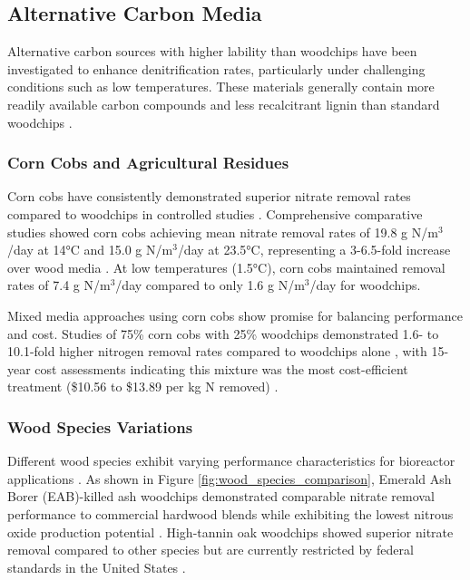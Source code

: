 \documentclass[12pt,a4paper]{article}
\begin{document}
\subsection{Alternative Carbon Media}

Alternative carbon sources with higher lability than woodchips have been investigated to enhance denitrification rates, particularly under challenging conditions such as low temperatures. These materials generally contain more readily available carbon compounds and less recalcitrant lignin than standard woodchips \citep{new_ref_2}.

\subsubsection{Corn Cobs and Agricultural Residues}

Corn cobs have consistently demonstrated superior nitrate removal rates compared to woodchips in controlled studies \citep{new_ref_2}. Comprehensive comparative studies showed corn cobs achieving mean nitrate removal rates of 19.8 g N/m$^3$/day at 14°C and 15.0 g N/m$^3$/day at 23.5°C, representing a 3-6.5-fold increase over wood media \citep{new_ref_2}. At low temperatures (1.5°C), corn cobs maintained removal rates of 7.4 g N/m$^3$/day compared to only 1.6 g N/m$^3$/day for woodchips.

Mixed media approaches using corn cobs show promise for balancing performance and cost. Studies of 75\% corn cobs with 25\% woodchips demonstrated 1.6- to 10.1-fold higher nitrogen removal rates compared to woodchips alone \citep{new_ref_4}, with 15-year cost assessments indicating this mixture was the most cost-efficient treatment (\$10.56 to \$13.89 per kg N removed) \citep{new_ref_4}.

\subsubsection{Wood Species Variations}

Different wood species exhibit varying performance characteristics for bioreactor applications \citep{new_ref_4}. As shown in Figure \ref{fig:wood_species_comparison}, Emerald Ash Borer (EAB)-killed ash woodchips demonstrated comparable nitrate removal performance to commercial hardwood blends while exhibiting the lowest nitrous oxide production potential \citep{new_ref_4}. High-tannin oak woodchips showed superior nitrate removal compared to other species but are currently restricted by federal standards in the United States \citep{new_ref_4}.
\end{document}
